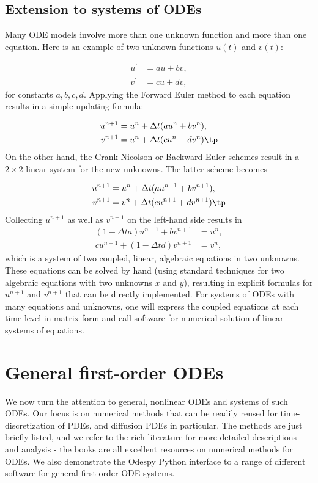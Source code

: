 \documentclass[graybox,sectrefs,envcountresetchap,open=right,final]{svmonodo}
\begin{document}
\subsection{Extension to systems of ODEs}

Many ODE models involve more than one unknown function and more
than one equation. Here is an example of two unknown functions $u(t)$
and $v(t)$:

\begin{align}
u^{\prime} &= a u + bv,\\ 
v^{\prime} &= cu +  dv,
\end{align}
for constants $a,b,c,d$.
Applying the Forward Euler method to each equation results in a simple
updating formula:

\begin{align}
u^{n+1} &= u^n + \Delta t (a u^n + b v^n),\\ 
v^{n+1} &= u^n + \Delta t (cu^n + dv^n)
\tp
\end{align}
On the other hand, the Crank-Nicolson or Backward Euler schemes result in a
$2\times 2$ linear system for the new unknowns. The latter scheme becomes

\begin{align}
u^{n+1} &= u^n + \Delta t (a u^{n+1} + b v^{n+1}),\\ 
v^{n+1} &= v^n + \Delta t (c u^{n+1} + d v^{n+1})\tp
\end{align}
Collecting $u^{n+1}$ as well as $v^{n+1}$ on the left-hand side results
in
\begin{align}
(1 - \Delta t a)u^{n+1} + bv^{n+1} &= u^n ,\\ 
c u^{n+1} + (1 - \Delta t d) v^{n+1} &= v^n ,
\end{align}
which is a system of two coupled, linear, algebraic equations in two
unknowns. These equations can be solved by hand (using standard
techniques for two algebraic equations with two unknowns $x$ and $y$),
resulting in explicit formulas for $u^{n+1}$ and $v^{n+1}$ that can be
directly implemented. For systems of ODEs with many equations and unknowns, one
will express the coupled equations at each time level in matrix form
and call software for numerical solution of linear systems of equations.

\section{General first-order ODEs}

We now turn the attention to general, nonlinear ODEs and systems of
such ODEs.  Our focus is on numerical methods that can be readily
reused for time-discretization of PDEs, and diffusion PDEs in particular.
The methods are just briefly listed, and we refer to the rich literature
for more detailed descriptions and analysis - the books
\cite{Petzold_Ascher_1998,Griffiths_et_al_2010,Hairer_Wanner_Norsett_bookI,Hairer_Wanner_bookII} are all excellent resources on numerical methods for ODEs.
We also demonstrate the Odespy Python interface to a range
of different software for general first-order ODE systems.
\end{document}
